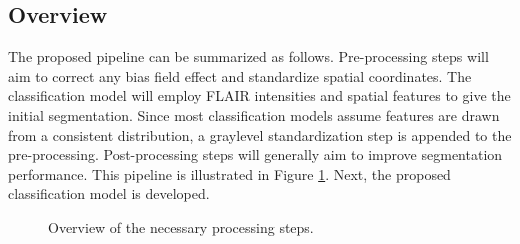 \subsection{Overview}
The proposed pipeline can be summarized as follows.
Pre-processing steps will aim to correct any bias field effect and standardize spatial coordinates.
The classification model will employ FLAIR intensities and spatial features to give the initial segmentation.
Since most classification models assume features are drawn from a consistent distribution, a graylevel standardization step is appended to the pre-processing.
Post-processing steps will generally aim to improve segmentation performance.
This pipeline is illustrated in Figure \ref{fig:pipeline}.
Next, the proposed classification model is developed.
\begin{figure}
  \centering\scalebox{0.65}{}
  \caption{Overview of the necessary processing steps.}
  \label{fig:pipeline}
\end{figure}
